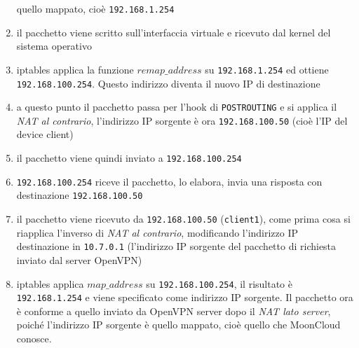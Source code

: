 \begin{enumerate}
  quello mappato, cioè \texttt{192.168.1.254}
  \item il pacchetto viene scritto sull'interfaccia virtuale e ricevuto dal kernel
  del sistema operativo
  \item iptables applica la funzione $remap\_address$ su \texttt{192.168.1.254} ed ottiene
  \texttt{192.168.100.254}. Questo indirizzo diventa il nuovo IP di destinazione
  \item a questo punto il pacchetto passa per l'hook di \texttt{POSTROUTING} e si applica il
  \textit{NAT al contrario}, l'indirizzo IP sorgente è ora \texttt{192.168.100.50}
  (cioè l'IP del device client)
  \item il pacchetto viene quindi inviato a \texttt{192.168.100.254}
  \item \texttt{192.168.100.254} riceve il pacchetto, lo elabora, invia una risposta
  con destinazione \texttt{192.168.100.50}
  \item il pacchetto viene ricevuto da \texttt{192.168.100.50} (\texttt{client1}),
  come prima cosa
  si riapplica l'inverso di \textit{NAT al contrario}, modificando l'indirizzo IP
  destinazione in \texttt{10.7.0.1} (l'indirizzo IP sorgente del pacchetto di richiesta
  inviato dal server OpenVPN)
  \item iptables applica $map\_address$ su \texttt{192.168.100.254}, il risultato è
  \texttt{192.168.1.254} e viene specificato come indirizzo IP sorgente.
  Il pacchetto ora è conforme a quello inviato da OpenVPN server dopo il
  \textit{NAT lato server}, poiché l'indirizzo IP sorgente è quello mappato, cioè quello
  che MoonCloud conosce.

\end{enumerate}
